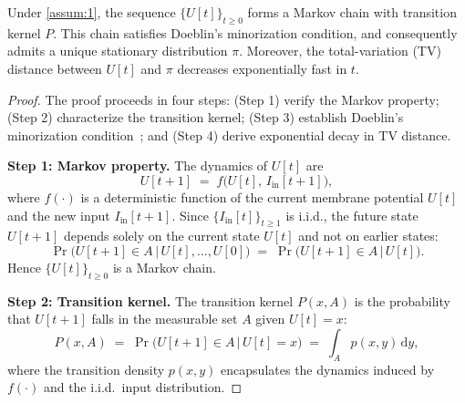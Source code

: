 \begin{theorem}
\label{thm:1}
Under \cref{assum:1}, the sequence $\{U[t]\}_{t \ge 0}$ forms a Markov chain with transition kernel $P$. This chain satisfies Doeblin's minorization condition, and consequently admits a unique stationary distribution $\pi$. Moreover, the total-variation (TV) distance between $U[t]$ and $\pi$ decreases exponentially fast in $t$.
\end{theorem}

\begin{proof}
The proof proceeds in four steps: (Step 1) verify the Markov property; (Step 2) characterize the transition kernel; (Step 3) establish Doeblin's minorization condition~\cite{rosenthal:1995}; and (Step 4) derive exponential decay in TV distance.

\medskip
\noindent\textbf{Step 1: Markov property.}
The dynamics of $U[t]$ are
\begin{equation}
    U[t+1] \;=\; f\!\bigl(U[t],\,I_{\text{in}}[t+1]\bigr),
\end{equation}
where $f(\cdot)$ is a deterministic function of the current membrane potential $U[t]$ and the new input $I_{\text{in}}[t+1]$. Since $\{I_{\text{in}}[t]\}_{t\ge1}$ is i.i.d., the future state $U[t+1]$ depends solely on the current state $U[t]$ and not on earlier states:
\begin{equation}
    \Pr\bigl(U[t+1]\in A \,\big|\, U[t],\dots,U[0]\bigr)
    \;=\;
    \Pr\bigl(U[t+1]\in A \,\big|\, U[t]\bigr).
\end{equation}
Hence $\{U[t]\}_{t\ge0}$ is a Markov chain.

\medskip
\noindent\textbf{Step 2: Transition kernel.}
The transition kernel $P(x,A)$ is the probability that $U[t+1]$ falls in the measurable set $A$ given $U[t]=x$:
\begin{equation}
    P(x,A) \;=\; \Pr\bigl(U[t+1]\in A \,\big|\, U[t]=x\bigr)
    \;=\; \int_{A} p(x,y)\,\mathrm{d}y,
\end{equation}
where the transition density $p(x,y)$ encapsulates the dynamics induced by $f(\cdot)$ and the i.i.d.\ input distribution.


\end{proof}
